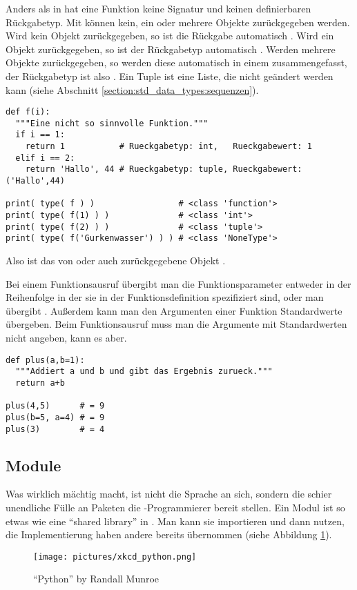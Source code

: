 Anders als in \CC hat eine Funktion keine Signatur und keinen definierbaren Rückgabetyp.
Mit  können kein, ein oder mehrere Objekte zurückgegeben werden.
Wird kein Objekt zurückgegeben, so ist die Rückgabe automatisch .
Wird ein Objekt  zurückgegeben, so ist der Rückgabetyp automatisch .
Werden mehrere Objekte zurückgegeben, so werden diese automatisch in einem  zusammengefasst, der Rückgabetyp ist also .
Ein Tuple ist eine Liste, die nicht geändert werden kann (siehe Abschnitt \ref{section:std_data_types:sequenzen}).
\begin{lstlisting}
def f(i):
  """Eine nicht so sinnvolle Funktion."""
  if i == 1:
    return 1           # Rueckgabetyp: int,   Rueckgabewert: 1
  elif i == 2:
    return 'Hallo', 44 # Rueckgabetyp: tuple, Rueckgabewert: ('Hallo',44)

print( type( f ) )                 # <class 'function'>
print( type( f(1) ) )              # <class 'int'>
print( type( f(2) ) )              # <class 'tuple'>
print( type( f('Gurkenwasser') ) ) # <class 'NoneType'>
\end{lstlisting}
Also ist das von  oder auch  zurückgegebene Objekt .

Bei einem Funktionsausruf übergibt man die Funktionsparameter entweder in der Reihenfolge in der sie in der Funktionsdefinition spezifiziert sind,
oder man übergibt .
Außerdem kann man den Argumenten einer Funktion Standardwerte übergeben.
Beim Funktionsausruf muss man die Argumente mit Standardwerten nicht angeben, kann es aber.
\begin{lstlisting}
def plus(a,b=1):
  """Addiert a und b und gibt das Ergebnis zurueck."""
  return a+b

plus(4,5)      # = 9
plus(b=5, a=4) # = 9
plus(3)        # = 4
\end{lstlisting}


\subsection{Module}
\label{section:crashkurs:module}
Was \Python wirklich mächtig macht, ist nicht die Sprache an sich, sondern die schier unendliche Fülle an Paketen die \Python-Programmierer bereit stellen.
Ein Modul ist so etwas wie eine ``shared library'' in \CC.
Man kann sie importieren und dann nutzen, die Implementierung haben andere bereits übernommen (siehe Abbildung \ref{figure:xkcd_python}).
\begin{figure}[ht]
  \centering
  \texttt{[image: pictures/xkcd\_python.png]}
  \caption{\label{figure:xkcd_python}``Python'' by Randall Munroe \cite{Munroe_python}}
\end{figure}

